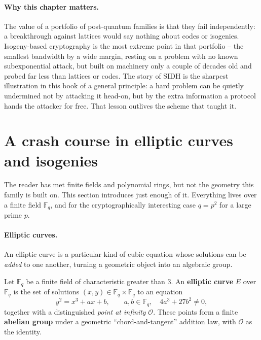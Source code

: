 \paragraph{Why this chapter matters.}
The value of a portfolio of post-quantum families is that they fail independently: a breakthrough against lattices would say nothing about codes or isogenies. Isogeny-based cryptography is the most extreme point in that portfolio -- the smallest bandwidth by a wide margin, resting on a problem with no known subexponential attack, but built on machinery only a couple of decades old and probed far less than lattices or codes. The story of SIDH is the sharpest illustration in this book of a general principle: a hard problem can be quietly undermined not by attacking it head-on, but by the extra information a protocol hands the attacker for free. That lesson outlives the scheme that taught it.

\section{A crash course in elliptic curves and isogenies}

The reader has met finite fields and polynomial rings, but not the geometry this family is built on. This section introduces just enough of it. Everything lives over a finite field $\mathbb{F}_q$, and for the cryptographically interesting case $q = p^2$ for a large prime $p$.

\paragraph{Elliptic curves.}
An elliptic curve is a particular kind of cubic equation whose solutions can be \emph{added} to one another, turning a geometric object into an algebraic group.

\begin{definition}
Let $\mathbb{F}_q$ be a finite field of characteristic greater than $3$. An \textbf{elliptic curve} $E$ over $\mathbb{F}_q$ is the set of solutions $(x,y) \in \mathbb{F}_q \times \mathbb{F}_q$ to an equation
\[
  y^2 = x^3 + a x + b, \qquad a,b \in \mathbb{F}_q, \quad 4a^3 + 27b^2 \neq 0,
\]
together with a distinguished \emph{point at infinity} $\mathcal{O}$. These points form a finite \textbf{abelian group} under a geometric ``chord-and-tangent'' addition law, with $\mathcal{O}$ as the identity.
\end{definition}

